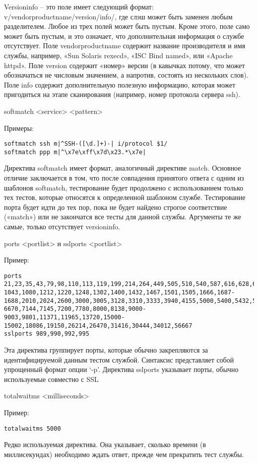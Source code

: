 \documentclass[12pt,a4paper]{report}
\begin{document}
Versioninfo – это поле имеет следующий формат: v/vendorproductname/version/info/, где слэш может быть заменен любым разделителем. Любое из трех полей может быть пустым. Кроме этого, поле само может быть пустым, и это означает, что дополнительная информация о службе отсутствует. Поле vendorproductname содержит название производителя и имя службы, например, «Sun Solaris rexecd», «ISC Bind named», или «Apache httpd». Поле version содержит «номер» версии (в кавычках потому, что может обозначаться не числовым значением, а напротив, состоять из нескольких слов). Поле info содержит дополнительную полезную информацию, которая может пригодиться на этапе сканирования (например, номер протокола сервера ssh).


softmatch <service> <pattern>

Примеры:
\begin{verbatim}
softmatch ssh m|^SSH-([\d.]+)-| i/protocol $1/
softmatch ppp m|^\x7e\xff\x7d\x23.*\x7e|
\end{verbatim}
Директива softmatch имеет формат, аналогичный директиве match. Основное отличие заключается в том, что после совпадения принятого ответа с одним из шаблонов softmatch, тестирование будет продолжено с использованием только тех тестов, которые относятся к определенной шаблоном службе. Тестирование порта будет идти до тех пор, пока не будет найдено строгое соответствие («match») или не закончатся все тесты для данной службы. Аргументы те же самые, только отсутствует versioninfo.

ports <portlist> и sslports <portlist>

Пример:
\begin{verbatim}
ports 21,23,35,43,79,98,110,113,119,199,214,264,449,505,510,540,587,616,628,666,731,771,782,1000,1010,1040-1043,1080,1212,1220,1248,1302,1400,1432,1467,1501,1505,1666,1687-1688,2010,2024,2600,3000,3005,3128,3310,3333,3940,4155,5000,5400,5432,5555,5570,6112,6667-6670,7144,7145,7200,7780,8000,8138,9000-9003,9801,11371,11965,13720,15000-15002,18086,19150,26214,26470,31416,30444,34012,56667
sslports 989,990,992,995
\end{verbatim}
Эта директива группирует порты, которые обычно закрепляются за идентифицируемой данным тестом службой. Синтаксис представляет собой упрощенный формат опции ‘-p’. Директива sslports указывает порты, обычно используемые совместно с SSL

totalwaitms <milliseconds>

Пример:
\begin{verbatim}
totalwaitms 5000
\end{verbatim}
Редко используемая директива. Она указывает, сколько времени (в миллисекундах) необходимо ждать ответ, прежде чем прекратить тест службы.
\end{document}

